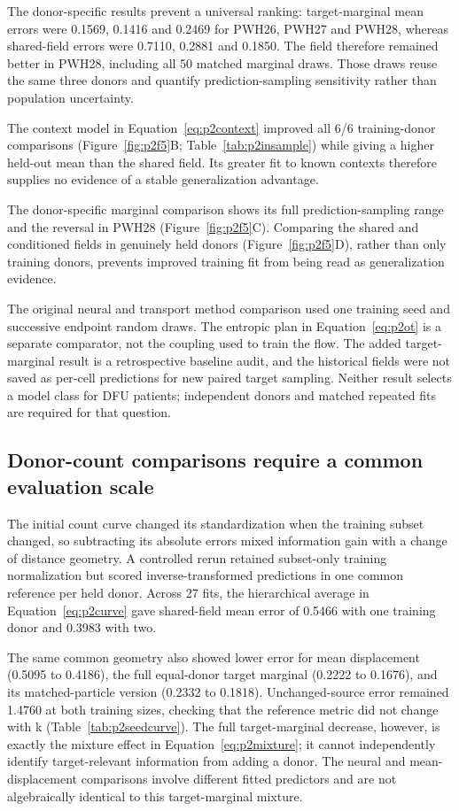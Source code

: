 \documentclass[10pt,a4paper]{article}
\begin{document}
The donor-specific results prevent a universal ranking: target-marginal mean errors were 0.1569, 0.1416 and 0.2469 for PWH26, PWH27 and PWH28, whereas shared-field errors were 0.7110, 0.2881 and 0.1850. The field therefore remained better in PWH28, including all 50 matched marginal draws. Those draws reuse the same three donors and quantify prediction-sampling sensitivity rather than population uncertainty.

The context model in Equation~\eqref{eq:p2context} improved all 6/6 training-donor comparisons (Figure~\ref{fig:p2f5}B; Table~\ref{tab:p2insample}) while giving a higher held-out mean than the shared field. Its greater fit to known contexts therefore supplies no evidence of a stable generalization advantage.




The donor-specific marginal comparison shows its full prediction-sampling range and the reversal in PWH28 (Figure~\ref{fig:p2f5}C). Comparing the shared and conditioned fields in genuinely held donors (Figure~\ref{fig:p2f5}D), rather than only training donors, prevents improved training fit from being read as generalization evidence.

The original neural and transport method comparison used one training seed and successive endpoint random draws. The entropic plan in Equation~\eqref{eq:p2ot} is a separate comparator, not the coupling used to train the flow. The added target-marginal result is a retrospective baseline audit, and the historical fields were not saved as per-cell predictions for new paired target sampling. Neither result selects a model class for DFU patients; independent donors and matched repeated fits are required for that question.

\subsection{Donor-count comparisons require a common evaluation scale}

The initial count curve changed its standardization when the training subset changed, so subtracting its absolute errors mixed information gain with a change of distance geometry. A controlled rerun retained subset-only training normalization but scored inverse-transformed predictions in one common reference per held donor. Across 27 fits, the hierarchical average in Equation~\eqref{eq:p2curve} gave shared-field mean error of 0.5466 with one training donor and 0.3983 with two.

The same common geometry also showed lower error for mean displacement (0.5095 to 0.4186), the full equal-donor target marginal (0.2222 to 0.1676), and its matched-particle version (0.2332 to 0.1818). Unchanged-source error remained 1.4760 at both training sizes, checking that the reference metric did not change with k (Table~\ref{tab:p2seedcurve}). The full target-marginal decrease, however, is exactly the mixture effect in Equation~\eqref{eq:p2mixture}; it cannot independently identify target-relevant information from adding a donor. The neural and mean-displacement comparisons involve different fitted predictors and are not algebraically identical to this target-marginal mixture.
\end{document}
